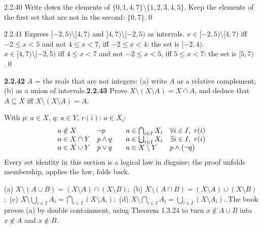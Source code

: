 \begin{bookex}[essential]{2.2.40}
Write down the elements of $\{0,1,4,7\}\setminus\{1,2,3,4,5\}$.
\solution
Keep the elements of the first set that are not in the second: $\{0,7\}$.\qed
\end{bookex}

\begin{bookex}[recommended]{2.2.41}
Express $[-2,5)\setminus[4,7)$ and $[4,7)\setminus[-2,5)$ as intervals.
\solution
$x\in[-2,5)\setminus[4,7)$ iff $-2\le x<5$ and not $4\le x<7$, iff $-2\le x<4$: the set is $[-2,4)$.\\
$x\in[4,7)\setminus[-2,5)$ iff $4\le x<7$ and not $-2\le x<5$, iff $5\le x<7$: the set is $[5,7)$.\qed
\end{bookex}

\begin{trybox}[{2.2.42, 2.2.43 \fO}]
\textbf{2.2.42} $A$ = the reals that are not integers: (a) write $A$ as a relative complement; (b) as a union of intervals.\quad \textbf{2.2.43} Prove $X\setminus(X\setminus A)=X\cap A$, and deduce that $A\subseteq X$ iff $X\setminus(X\setminus A)=A$.
\end{trybox}

\begin{key}
With $p$: $a\in X$, $q$: $a\in Y$, $r(i)$: $a\in X_i$:
\[
\begin{array}{ll@{\qquad}ll}
a\notin X & \neg p & a\in\bigcap_{i\in I}X_i & \forall i\in I,\ r(i)\\
a\in X\cap Y & p\wedge q & a\in\bigcup_{i\in I}X_i & \exists i\in I,\ r(i)\\
a\in X\cup Y & p\vee q & a\in X\setminus Y & p\wedge(\neg q)
\end{array}
\]
Every set identity in this section is a logical law in disguise; the proof unfolds membership, applies the law, folds back.
\end{key}
\begin{result}
(a) $X\setminus(A\cup B)=(X\setminus A)\cap(X\setminus B)$;\ (b) $X\setminus(A\cap B)=(X\setminus A)\cup(X\setminus B)$;\ (c) $X\setminus\bigcup_{i\in I}A_i=\bigcap_{i\in I}(X\setminus A_i)$;\ (d) $X\setminus\bigcap_{i\in I}A_i=\bigcup_{i\in I}(X\setminus A_i)$. The book proves (a) by double containment, using Theorem 1.3.24 to turn $x\notin A\cup B$ into $x\notin A$ and $x\notin B$.
\end{result}

